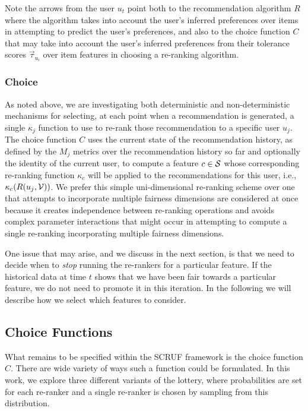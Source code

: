 Note the arrows from the user $u_t$ point both to the recommendation algorithm $R$ where the algorithm takes into account the user's inferred preferences over items in attempting to predict the user's preferences, and also to the choice function $C$ that may take into account the user's inferred preferences from their tolerance scores $\vec{\tau}_{u_i}$ over item features in choosing a re-ranking algorithm. 


\subsubsection{\textbf{Choice}}
\hfill

As noted above, we are investigating both deterministic and non-deterministic mechanisms for selecting, at each point when a recommendation is generated, a single $\kappa_j$ function to use to re-rank those recommendation to a specific user $u_j$. The choice function $C$ uses the current state of the recommendation history, as defined by the $M_j$ metrics over the recommendation history so far and optionally the identity of the current user, to compute a feature $c \in \mathcal{S}$  whose corresponding re-ranking function $\kappa_c$ will be applied to the recommendations for this user, i.e., $\kappa_c(R(u_j, \mathcal{V}))$. We prefer this simple uni-dimensional re-ranking scheme over one that attempts to incorporate multiple fairness dimensions are considered at once because it creates independence between re-ranking operations and avoids complex parameter interactions that might occur in attempting to compute a single re-ranking incorporating multiple fairness dimensions.

One issue that may arise, and we discuss in the next section, is that we need to decide when to \emph{stop} running the re-rankers for a particular feature. If the historical data at time $t$ shows that we have been fair towards a particular feature, we do not need to promote it in this iteration. In the following we will describe how we select which features to consider.

\subsection{\textbf{Choice Functions}}

What remains to be specified within the SCRUF framework is the choice function $C$. There are wide variety of ways such a function could be formulated. In this work, we explore three different variants of the lottery, where probabilities are set for each re-ranker and a single re-ranker is chosen by sampling from this distribution.

